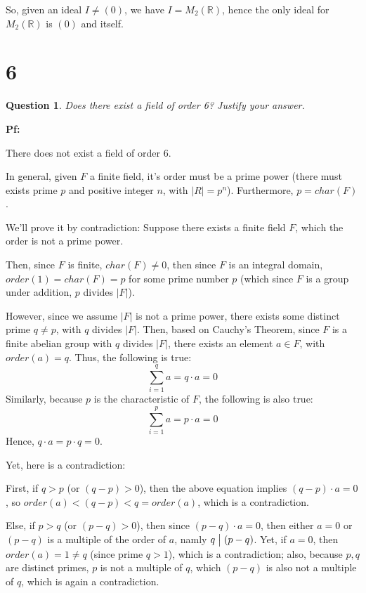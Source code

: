\documentclass{article}
\newtheorem{question}{Question}
\begin{document}
\hfill

So, given an ideal $I\neq (0)$, we have $I=M_2(\mathbb{R})$, hence the only ideal for $M_2(\mathbb{R})$ is $(0)$ and itself.




\break


\section*{6}
\begin{myBox}[]{}
    \begin{question}
        Does there exist a field of order 6? Justify your answer.
    \end{question}
\end{myBox}

\textbf{Pf:}

There does not exist a field of order $6$. 

In general, given $F$ a finite field, it's order must be a prime power (there must exists prime $p$ and positive integer $n$, with $|R|=p^n$). Furthermore, $p=char(F)$.

\hfill

We'll prove it by contradiction: Suppose there exists a finite field $F$, which the order is not a prime power.

Then, since $F$ is finite, $char(F)\neq 0$, then since $F$ is an integral domain, $order(1)=char(F)=p$ for some prime number $p$ (which since $F$ is a group under addition, $p$ divides $|F|$).

However, since we assume $|F|$ is not a prime power, there exists some distinct prime $q\neq p$, with $q$ divides $|F|$.
Then, based on Cauchy's Theorem, since $F$ is a finite abelian group with $q$ divides $|F|$, there exists an element $a\in F$, with $order(a)=q$. Thus, the following is true:
$$\sum_{i=1}^{q}a = q\cdot a = 0$$
Similarly, because $p$ is the characteristic of $F$, the following is also true:
$$\sum_{i=1}^{p}a=p\cdot a = 0$$
Hence, $q\cdot a=p\cdot q=0$.

Yet, here is a contradiction:

First, if $q>p$ (or $(q-p)>0$), then the above equation implies $(q-p)\cdot a=0$, so $order(a)<(q-p)<q=order(a)$, which is a contradiction.

Else, if $p>q$ (or $(p-q)>0$), then since $(p-q)\cdot a=0$, then either $a=0$ or $(p-q)$ is a multiple of the order of $a$, namly $q\bigm| (p-q)$.
Yet, if $a=0$, then $order(a)=1\neq q$ (since prime $q>1$), which is a contradiction;
also, because $p,q$ are distinct primes, $p$ is not a multiple of $q$, which $(p-q)$ is also not a multiple of $q$, which is again a contradiction.
\end{document}
